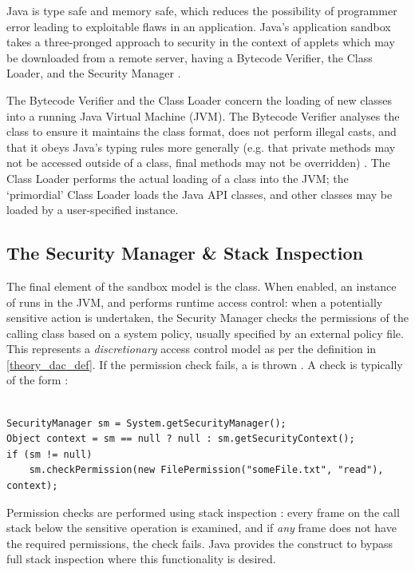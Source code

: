 Java is type safe and memory safe, which reduces the possibility of programmer error leading to exploitable flaws in an application. Java's application sandbox takes a three-pronged approach to security in the context of applets which may be downloaded from a remote server, having a Bytecode Verifier, the Class Loader, and the Security Manager \cite{mcgraw1999securingjava}.

The Bytecode Verifier and the Class Loader concern the loading of new classes into a running Java Virtual Machine (JVM). The Bytecode Verifier analyses the class to ensure it maintains the class format, does not perform illegal casts, and that it obeys Java's typing rules more generally (e.g. that private methods may not be accessed outside of a class, final methods may not be overridden) \cite{lindholm2014java}. The Class Loader performs the actual loading of a class into the JVM; the `primordial' Class Loader \cite{mcgraw1999securingjava} loads the Java API classes, and other classes may be loaded by a user-specified  instance.

\subsection{The Security Manager \& Stack Inspection}

The final element of the sandbox model is the  class. When enabled, an instance of  runs in the JVM, and performs runtime access control: when a potentially sensitive action is undertaken, the Security Manager checks the permissions of the calling class based on a system policy, usually specified by an external policy file. This represents a \textit{discretionary} access control model as per the definition in \ref{theory_dac_def}. If the permission check fails, a  is thrown \cite{gosling2014java}. A check is typically of the form \cite{javasecmanagerdoc}:

\begin{verbatim}

SecurityManager sm = System.getSecurityManager();
Object context = sm == null ? null : sm.getSecurityContext();
if (sm != null)
	sm.checkPermission(new FilePermission("someFile.txt", "read"), context);
\end{verbatim}

Permission checks are performed using stack inspection \cite{gong2003javasecurity}: every frame on the call stack below the sensitive operation is examined, and if \textit{any} frame does not have the required permissions, the check fails. Java provides the  construct to bypass full stack inspection \cite{gong2003javasecurity} where this functionality is desired.

